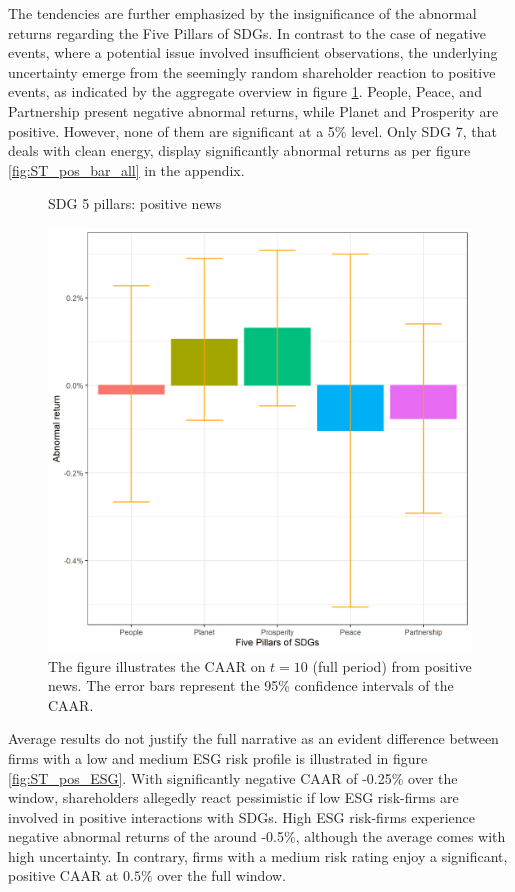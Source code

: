 The tendencies are further emphasized by the insignificance of the abnormal returns regarding the Five Pillars of SDGs. In contrast to the case of negative events, where a potential issue involved insufficient observations, the underlying uncertainty emerge from the seemingly random shareholder reaction to positive events, as indicated by the aggregate overview in figure \ref{fig:ST_pos_bar}. People, Peace, and Partnership present negative abnormal returns, while Planet and Prosperity are positive. However, none of them are significant at a 5\% level. Only SDG 7, that deals with clean energy, display significantly abnormal returns as per figure \ref{fig:ST_pos_bar_all} in the appendix. 

\begin{figure} [H]
    \centering
    \caption{SDG 5 pillars: positive news}
    \includegraphics[scale=0.6]{Projekt/1.Figures analysis/ST_positive_sdg_bar_groups_0.png}
    \caption*{\footnotesize The figure illustrates the CAAR on $t = 10$ (full period) from positive news. The error bars represent the 95\% confidence intervals of the CAAR.}
    \label{fig:ST_pos_bar}
\end{figure}

 
Average results do not justify the full narrative as an evident difference between firms with a low and medium ESG risk profile is illustrated in figure \ref{fig:ST_pos_ESG}. With significantly negative CAAR of -0.25\% over the window, shareholders allegedly react pessimistic if low ESG risk-firms are involved in positive interactions with SDGs. High ESG risk-firms experience negative abnormal returns of the around -0.5\%, although the average comes with high uncertainty. In contrary, firms with a medium risk rating enjoy a significant, positive CAAR at $0.5\%$ over the full window. 

